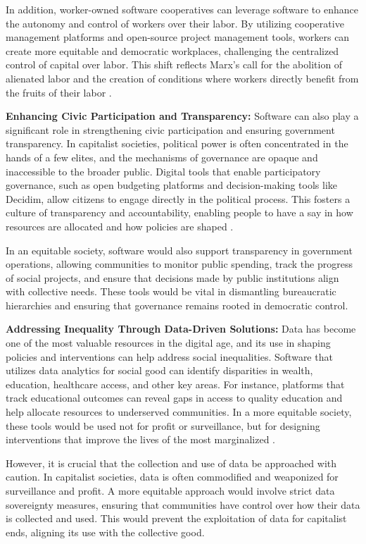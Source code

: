 \begin{refsection}
In addition, worker-owned software cooperatives can leverage software to enhance the autonomy and control of workers over their labor. By utilizing cooperative management platforms and open-source project management tools, workers can create more equitable and democratic workplaces, challenging the centralized control of capital over labor. This shift reflects Marx’s call for the abolition of alienated labor and the creation of conditions where workers directly benefit from the fruits of their labor \cite[pp.~378-380]{marx1867}.

\textbf{Enhancing Civic Participation and Transparency:}
Software can also play a significant role in strengthening civic participation and ensuring government transparency. In capitalist societies, political power is often concentrated in the hands of a few elites, and the mechanisms of governance are opaque and inaccessible to the broader public. Digital tools that enable participatory governance, such as open budgeting platforms and decision-making tools like Decidim, allow citizens to engage directly in the political process. This fosters a culture of transparency and accountability, enabling people to have a say in how resources are allocated and how policies are shaped \cite[pp.~88-90]{zuboff2020}.

In an equitable society, software would also support transparency in government operations, allowing communities to monitor public spending, track the progress of social projects, and ensure that decisions made by public institutions align with collective needs. These tools would be vital in dismantling bureaucratic hierarchies and ensuring that governance remains rooted in democratic control.

\textbf{Addressing Inequality Through Data-Driven Solutions:}
Data has become one of the most valuable resources in the digital age, and its use in shaping policies and interventions can help address social inequalities. Software that utilizes data analytics for social good can identify disparities in wealth, education, healthcare access, and other key areas. For instance, platforms that track educational outcomes can reveal gaps in access to quality education and help allocate resources to underserved communities. In a more equitable society, these tools would be used not for profit or surveillance, but for designing interventions that improve the lives of the most marginalized \cite[pp.~65-67]{noble2018}.

However, it is crucial that the collection and use of data be approached with caution. In capitalist societies, data is often commodified and weaponized for surveillance and profit. A more equitable approach would involve strict data sovereignty measures, ensuring that communities have control over how their data is collected and used. This would prevent the exploitation of data for capitalist ends, aligning its use with the collective good.


\end{refsection}
